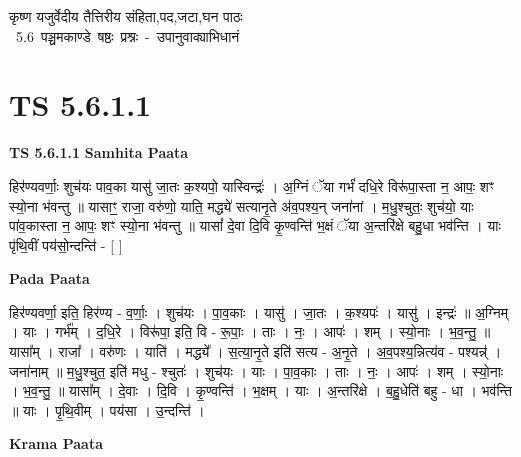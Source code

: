 \documentclass[17pt]{extarticle}
\begin{document}
\begin{titlepage}
    \begin{center}
 
\begin{sanskrit}
    { \Large
    कृष्ण यजुर्वेदीय तैत्तिरीय संहिता,पद,जटा,घन पाठः 
    }
    \\
    \vspace{2.5cm}
    \mbox{ \Large
    5.6      पञ्चमकाण्डे षष्ठः प्रश्नः - उपानुवाक्याभिधानं   }
\end{sanskrit}
\end{center}

\end{titlepage}
\tableofcontents
{}
\pagebreak


\section{ TS 5.6.1.1 }

\textbf{TS 5.6.1.1 } \newline
\textbf{Samhita Paata} \newline

हिर॑ण्यवर्णाः॒ शुच॑यः पाव॒का यासु॑ जा॒तः क॒श्यपो॒ यास्विन्द्रः॑ । अ॒ग्निं ॅया गर्भं॑ दधि॒रे विरू॑पा॒स्ता न॒ आपः॒ शꣳ स्यो॒ना भ॑वन्तु ॥ यासाꣳ॒॒ राजा॒ वरु॑णो॒ याति॒ मद्ध्ये॑ सत्यानृ॒ते अ॑व॒पश्य॒न् जना॑नां । म॒धु॒श्चुतः॒ शुच॑यो॒ याः पा॑व॒कास्ता न॒ आपः॒ शꣳ स्यो॒ना भ॑वन्तु ॥ यासां᳚ दे॒वा दि॒वि कृ॒ण्वन्ति॑ भ॒क्षं ॅया अ॒न्तरि॑क्षे बहु॒धा भव॑न्ति । याः पृ॑थि॒वीं पय॑सो॒न्दन्ति॑ - [  ] \newline

\textbf{Pada Paata} \newline

हिर॑ण्यवर्णा॒ इति॒ हिर॑ण्य - व॒र्णाः॒ । शुच॑यः । पा॒व॒काः । यासु॑ । जा॒तः । क॒श्यपः॑ । यासु॑ । इन्द्रः॑ ॥ अ॒ग्निम् । याः । गर्भ᳚म् । द॒धि॒रे । विरू॑पा॒ इति॒ वि - रू॒पाः॒ । ताः । नः॒ । आपः॑ । शम् । स्यो॒नाः । भ॒व॒न्तु॒ ॥ यासा᳚म् । राजा᳚ । वरु॑णः । याति॑ । मद्ध्ये᳚ । स॒त्या॒नृ॒ते इति॑ सत्य - अ॒नृ॒ते । अ॒व॒पश्य॒न्नित्य॑व - पश्यन्न्॑ । जना॑नाम् ॥ म॒धु॒श्चुत॒ इति॑ मधु - श्चुतः॑ । शुच॑यः । याः । पा॒व॒काः । ताः । नः॒ । आपः॑ । शम् । स्यो॒नाः । भ॒व॒न्तु॒ ॥ यासा᳚म् । दे॒वाः । दि॒वि । कृ॒ण्वन्ति॑ । भ॒क्षम् । याः । अ॒न्तरि॑क्षे । ब॒हु॒धेति॑ बहु - धा । भव॑न्ति ॥ याः । पृ॒थि॒वीम् । पय॑सा । उ॒न्दन्ति॑ ।  \newline


\textbf{Krama Paata} \newline
\end{document}

